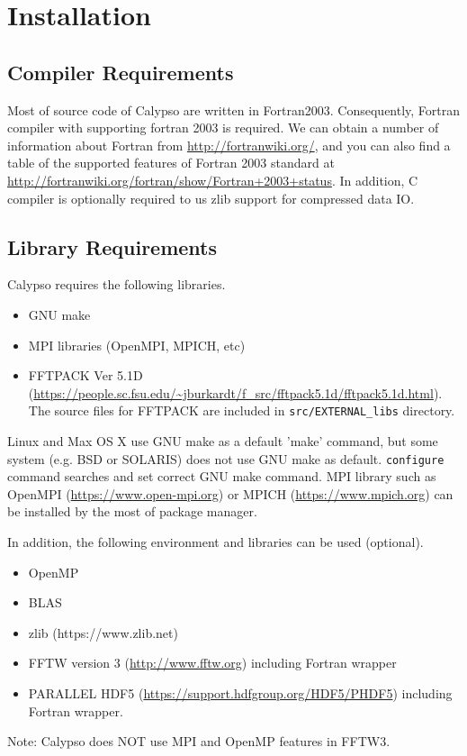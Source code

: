 \newpage
\section{Installation}


\subsection{Compiler Requirements}
Most of source code of Calypso are written in Fortran2003. Consequently, Fortran compiler with supporting fortran 2003 is required. We can obtain a number of information about Fortran from \url{http://fortranwiki.org/}, and you can also find a table of the supported features of Fortran 2003 standard at \url{http://fortranwiki.org/fortran/show/Fortran+2003+status}. In addition, C compiler is optionally required to us zlib support for compressed data IO. 

\subsection{Library Requirements}
\label{sec:requirements}
Calypso requires the following libraries.
\begin{itemize}
\item GNU make
\item MPI libraries (OpenMPI, MPICH, etc)
\item FFTPACK Ver 5.1D (\url{https://people.sc.fsu.edu/~jburkardt/f_src/fftpack5.1d/fftpack5.1d.html}). The source files for FFTPACK are included in {\tt src/EXTERNAL\_libs} directory.
\end{itemize}
Linux and Max OS X use GNU make as a default 'make' command, but some system (e.g. BSD or SOLARIS) does not use GNU make as default. \verb|configure| command searches and set correct GNU make command. MPI library such as OpenMPI (\url{https://www.open-mpi.org}) or MPICH (\url{https://www.mpich.org}) can be installed by the most of package manager.

In addition, the following environment and libraries can be used (optional).
\begin{itemize}
\item OpenMP 
\item BLAS
\item zlib (https://www.zlib.net)
\item FFTW version 3 (\url{http://www.fftw.org}) including Fortran wrapper
\item PARALLEL HDF5 (\url{https://support.hdfgroup.org/HDF5/PHDF5})  including Fortran wrapper.
\end{itemize}
Note: Calypso does NOT use MPI and OpenMP features in FFTW3. 

